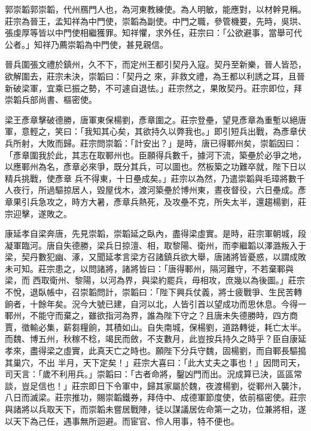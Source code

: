 
\begin{pinyinscope}

 郭崇韜郭崇韜，代州鴈門人也，為河東教練使。為人明敏，能應對，以材幹見稱。莊宗為晉王，孟知祥為中門使，崇韜為副使。中門之職，參管機要，先時，吳珙、張虔厚等皆以中門使相繼獲罪。知祥懼，求外任，莊宗曰：「公欲避事，當舉可代公者。」知祥乃薦崇韜為中門使，甚見親信。



 晉兵圍張文禮於鎮州，久不下，而定州王都引契丹入寇。契丹至新樂，晉人皆恐，欲解圍去，莊宗未決，崇韜曰：「契丹之
 來，非救文禮，為王都以利誘之耳，且晉新破梁軍，宜乘已振之勢，不可遽自退怯。」莊宗然之，果敗契丹。莊宗即位，拜崇韜兵部尚書、樞密使。



 梁王彥章擊破德勝，唐軍東保楊劉，彥章圍之。莊宗登壘，望見彥章為重塹以絕唐軍，意輕之，笑曰：「我知其心矣，其欲持久以弊我也。」即引短兵出戰，為彥章伏兵所射，大敗而歸。莊宗問崇韜：「計安出？」是時，唐已得鄆州矣，崇韜因曰：「彥章圍我於此，其志在取鄆州也。臣願得兵數千，據河下流，築壘於必爭之地，以應鄆州為名，彥章必來爭，既分其兵，可以圖也。然板築之功難卒就，陛下日以精兵挑戰，使彥章
 兵不得東，十日壘成矣。」莊宗以為然，乃遣崇韜與毛璋將數千人夜行，所過驅掠居人，毀屋伐木，渡河築壘於博州東，晝夜督役，六日壘成。彥章果引兵急攻之，時方大暑，彥章兵熱死，及攻壘不克，所失太半，還趨楊劉，莊宗迎擊，遂敗之。



 康延孝自梁奔唐，先見崇韜，崇韜延之臥內，盡得梁虛實。是時，莊宗軍朝城，段凝軍臨河。唐自失德勝，梁兵日掠澶、相，取黎陽、衛州，而李繼韜以澤潞叛入于梁，契丹數犯幽、涿，又聞延孝言梁方召諸鎮兵欲大舉，唐諸將皆憂惑，以謂成敗未可知。莊宗患之，以問諸將，諸將皆曰：「唐得鄆州，隔河難守，不若棄鄆與梁，而
 西取衛州、黎陽，以河為界，與梁約罷兵，毋相攻，庶幾以為後圖。」莊宗不悅，退臥帳中，召崇韜問計，崇韜曰：「陛下興兵仗義，將士疲戰爭、生民苦轉餉者，十餘年矣。況今大號已建，自河以北，人皆引首以望成功而思休息。今得一鄆州，不能守而棄之，雖欲指河為界，誰為陛下守之？且唐未失德勝時，四方商賈，徵輸必集，薪芻糧餉，其積如山。自失南城，保楊劉，道路轉徙，耗亡太半。而魏、博五州，秋稼不稔，竭民而斂，不支數月，此豈按兵持久之時乎？臣自康延孝來，盡得梁之虛實，此真天亡之時也。願陛下分兵守魏，固楊劉，而自鄆長驅搗其巢穴，不出
 半月，天下定矣！」莊宗大喜曰：「此大丈夫之事也！」因問司天，司天言：「歲不利用兵。」崇韜曰：「古者命將，鑿凶門而出。況成算已決，區區常談，豈足信也！」莊宗即日下令軍中，歸其家屬於魏，夜渡楊劉，從鄆州入襲汴，八日而滅梁。莊宗推功，賜崇韜鐵券，拜侍中、成德軍節度使，依前樞密使。莊宗與諸將以兵取天下，而崇韜未嘗居戰陣，徒以謀議居佐命第一之功，位兼將相，遂以天下為己任，遇事無所迴避。而宦官、伶人用事，特不便也。




\end{pinyinscope}
